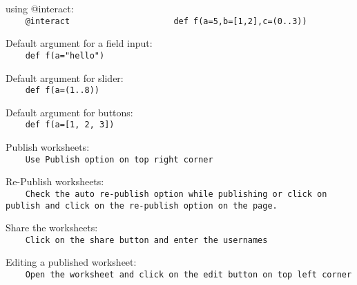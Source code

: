using @interact:\\
{\ex \lstinline|    @interact
                    def f(a=5,b=[1,2],c=(0..3))|}

Default argument for a field input:\\
{\ex \lstinline|    def f(a="hello")|}

Default argument for slider:\\
{\ex \lstinline|    def f(a=(1..8))|}

Default argument for buttons:\\
{\ex \lstinline|    def f(a=[1, 2, 3])|}

Publish worksheets:\\
{\ex \lstinline|    Use Publish option on top right corner|}

Re-Publish worksheets:\\
{\ex \lstinline|    Check the auto re-publish option while publishing or click
on publish and click on the re-publish option on the page.|}

Share the worksheets:\\
{\ex \lstinline|    Click on the share button and enter the usernames|}

Editing a published worksheet:\\
{\ex \lstinline|    Open the worksheet and click on the edit button on top left
corner|}
